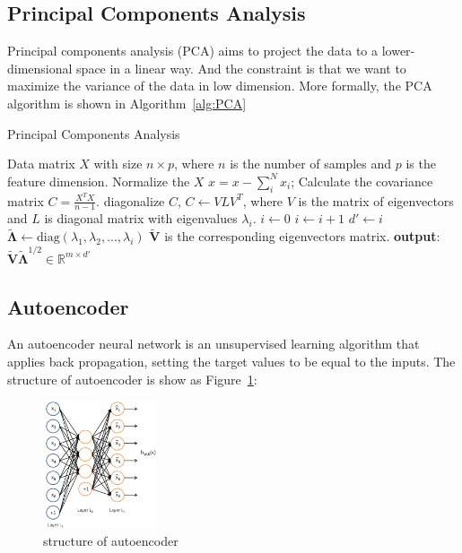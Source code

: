 \documentclass[sigconf]{acmart}
\begin{document}
\subsection{Principal Components Analysis}
Principal components analysis (PCA) \cite{dunteman1989principal} aims to project the data to a lower-dimensional space in a linear way. 
And the constraint is that we want to maximize the variance of the data in low dimension. More formally, the PCA algorithm is shown in Algorithm~\ref{alg:PCA} 

\begin{algorithm}[!htb]
	\caption{Principal Components Analysis}\label{alg:PCA}
	\begin{algorithmic}[1]
		\REQUIRE
		Data matrix $X$ with size $n\times p$, where $n$ is the number of samples and $p$ is the feature dimension.
		\STATE
		Normalize the $X$ $x=x-\sum_i^N x_i$;
		\STATE
		Calculate the covariance matrix $C=\frac{X^T X}{n-1}$.
		\STATE
		diagonalize $C$, $C\gets V L V^T$, where $V$ is the matrix of eigenvectors and $L$ is diagonal matrix with eigenvalues $\lambda_i$.
		\STATE
		$i \gets 0$
		\REPEAT
		\STATE
		$i \gets i+1$
		\STATE
		$d'\gets i$
		\STATE
		$\tilde{\mathbf{\Lambda}}\gets \text{diag}(\lambda_1,\lambda_2,...,\lambda_i)$
		\STATE
		$\tilde{\mathbf{V}}$ is the corresponding eigenvectors matrix.
		\STATE
		\textbf{output}:~~$\tilde{\mathbf{V}}\tilde{\mathbf{\Lambda}}^{1/2} \in \mathbb{R}^{m\times d'}$
	\end{algorithmic}
\end{algorithm}


\subsection{Autoencoder}
An autoencoder neural network \cite{ng2011sparse} is an unsupervised learning algorithm that applies back propagation, setting the target values to be equal to the inputs. The structure of autoencoder is show as Figure~\ref{auto_1}:
\begin{figure}[!ht]
	\centering
	\includegraphics[width=0.3\textwidth]{../figs/auto_1.png}
	\caption{structure of autoencoder}
	\label{auto_1}
	\centering
\end{figure}
\end{document}
